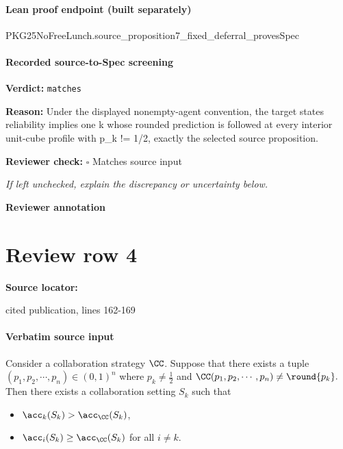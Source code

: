 \documentclass[10pt]{article}
\newcommand{\reviewerbox}{%
  \par\noindent\fbox{\parbox{0.96\linewidth}{\rule{0pt}{0.38in}}}\par
}
\newcommand{\reviewmatch}[1]{%
  \par\noindent\textbf{Reviewer check:} $\square$\; #1\par
  \noindent\emph{If left unchecked, explain the discrepancy or uncertainty below.}\par
}
\begin{document}
\paragraph{Lean proof endpoint (built separately)}\begin{ReviewVerbatim}
PKG25NoFreeLunch.source_proposition7_fixed_deferral_provesSpec
\end{ReviewVerbatim}

\paragraph{Recorded source-to-Spec screening}
\textbf{Verdict:} \texttt{matches}
\\
{\raggedright
\textbf{Reason:} Under the displayed nonempty-\allowbreak{}agent convention, the target states reliability implies one k whose rounded prediction is followed at every interior unit-\allowbreak{}cube profile with p\_\allowbreak{}k != 1/\allowbreak{}2, exactly the selected source proposition.\allowbreak{}
\par}
\reviewmatch{Matches source input}
\noindent\textbf{Reviewer annotation}\par
\reviewerbox
\clearpage
\hypertarget{source-claim-a888d560950f7c06}{}
\section*{Review row 4}
\textbf{Source locator:} {\footnotesize\raggedright cited publication, lines 162-\allowbreak{}169\par}
\paragraph{Verbatim source input}
\begin{ReviewVerbatim}
\begin{lemma}\label{lem:counterexample}
    Consider a collaboration strategy $\CC$. Suppose that there exists a tuple $(p_1,p_2,\cdots,p_n)\in (0,1)^n$ where $p_k\neq \frac{1}{2}$ and $\CC(p_1,p_2,\cdots,p_n)\neq \round{p_k}.$ Then there exists a collaboration setting $S_k$ such that
    \begin{itemize}
        \item[(i)] $\acc_k(S_k)>\acc_\CC(S_k)$,
        \item[(ii)]
        $\acc_i(S_k)\ge \acc_\CC(S_k)$ for all $i\neq k$.
    \end{itemize}
\end{lemma}
\end{ReviewVerbatim}
\end{document}
